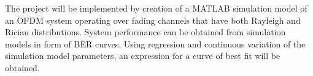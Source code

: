 
The project will be implemented by creation of a MATLAB simulation model of an \gls{OFDM} system operating over fading channels that have both Rayleigh and Rician distributions. System performance can be obtained from simulation models in form of \gls{BER} curves. Using regression and continuous variation of the simulation model parameters, an expression for a curve of best fit will be obtained.

